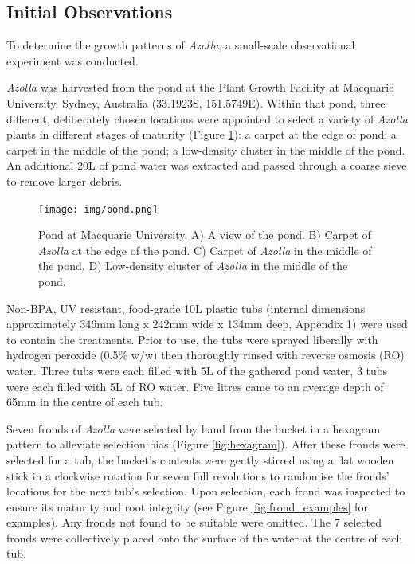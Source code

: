 \begin{bibunit}
\section*{Initial Observations}
To determine the growth patterns of \textit{Azolla}, a small-scale observational experiment was conducted.

\vspace{1em}
\textit{Azolla} was harvested from the pond at the Plant Growth Facility at Macquarie University, Sydney, Australia (33.1923\textdegree S, 151.5749\textdegree E). Within that pond, three different, deliberately chosen locations were appointed to select a variety of \textit{Azolla} plants in different stages of maturity (Figure \ref{fig:MQ_pond}): a carpet at the edge of pond; a carpet in the middle of the pond; a low-density cluster in the middle of the pond. An additional 20L of pond water was extracted and passed through a coarse sieve to remove larger debris.

\begin{figure}[H]
  \centering
  \texttt{[image: img/pond.png]}
  \caption{Pond at Macquarie University. A) A view of the pond. B) Carpet of \textit{Azolla} at the edge of the pond. C) Carpet of \textit{Azolla} in the middle of the pond. D) Low-density cluster of \textit{Azolla} in the middle of the pond.}
  \label{fig:MQ_pond}
\end{figure}

Non-BPA, UV resistant, food-grade 10L plastic tubs (internal dimensions approximately 346mm long x 242mm wide x 134mm deep, Appendix 1) were used to contain the treatments. Prior to use, the tubs were sprayed liberally with hydrogen peroxide (0.5\% w/w) then thoroughly rinsed with reverse osmosis (RO) water. Three tubs were each filled with 5L of the gathered pond water, 3 tubs were each filled with 5L of RO water. Five litres came to an average depth of 65mm in the centre of each tub.

\vspace{1em}
Seven fronds of \textit{Azolla} were selected by hand from the bucket in a hexagram pattern to alleviate selection bias (Figure \ref{fig:hexagram}). After these fronds were selected for a tub, the bucket’s contents were gently stirred using a flat wooden stick in a clockwise rotation for seven full revolutions to randomise the fronds’ locations for the next tub’s selection. Upon selection, each frond was inspected to ensure its maturity and root integrity (see Figure \ref{fig:frond_examples} for examples). Any fronds not found to be suitable were omitted. The 7 selected fronds were collectively placed onto the surface of the water at the centre of each tub.


\end{bibunit}
